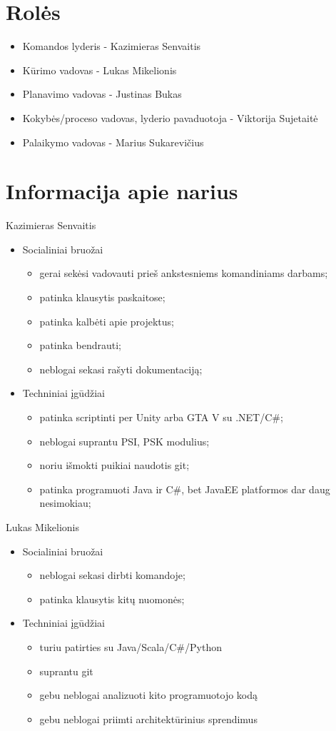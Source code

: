 \documentclass[11pt]{article}
\begin{document}
	\section{Rolės}
	\begin{itemize}
		\item Komandos lyderis - Kazimieras Senvaitis
		\item Kūrimo vadovas - Lukas Mikelionis
		\item Planavimo vadovas - Justinas Bukas
		\item Kokybės/proceso vadovas, lyderio pavaduotoja  - Viktorija Sujetaitė
		\item Palaikymo vadovas - Marius Sukarevičius
	\end{itemize}
	
	\section{Informacija apie narius}
	Kazimieras Senvaitis
	\begin{itemize}
		\item Socialiniai bruožai
		\begin{itemize}
			\item gerai sekėsi vadovauti prieš ankstesniems komandiniams darbams;
			\item patinka klausytis paskaitose;
			\item patinka kalbėti apie projektus;
			\item patinka bendrauti;
			\item neblogai sekasi rašyti dokumentaciją;
		\end{itemize}
		\item Techniniai įgūdžiai
		\begin{itemize}
			\item patinka scriptinti per Unity arba GTA V su .NET/C\#;
			\item neblogai suprantu PSI, PSK modulius;
			\item noriu išmokti puikiai naudotis git;
			\item patinka programuoti Java ir C\#, bet JavaEE platformos dar daug nesimokiau;
		\end{itemize}
	\end{itemize}
	Lukas Mikelionis
	\begin{itemize}
		\item Socialiniai bruožai
		\begin{itemize}
			\item neblogai sekasi dirbti komandoje;
			\item patinka klausytis kitų nuomonės;
		\end{itemize}
		\item Techniniai įgūdžiai
		\begin{itemize}
			\item turiu patirties su Java/Scala/C\#/Python
			\item suprantu git
			\item gebu neblogai analizuoti kito programuotojo kodą
			\item gebu neblogai priimti architektūrinius sprendimus
		\end{itemize}
	\end{itemize}
\end{document}

